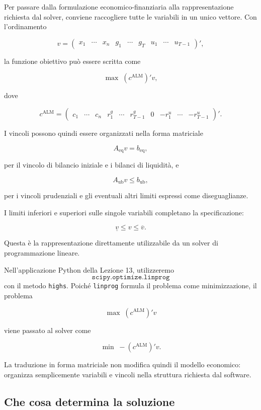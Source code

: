 Per passare dalla formulazione economico-finanziaria alla rappresentazione
richiesta dal solver, conviene raccogliere tutte le variabili in un unico
vettore. Con l'ordinamento

\[
v
=
\begin{pmatrix}
x_1 & \cdots & x_n &
g_1 & \cdots & g_T &
u_1 & \cdots & u_{T-1}
\end{pmatrix}',
\]

\noindent la funzione obiettivo pu\`o essere scritta come

\[
\max\; (c^{\mathrm{ALM}})'v,
\]

\noindent dove

\[
c^{\mathrm{ALM}}
=
\begin{pmatrix}
c_1 & \cdots & c_n &
r_1^{g} & \cdots & r_{T-1}^{g} & 0 &
-r_1^{u} & \cdots & -r_{T-1}^{u}
\end{pmatrix}'.
\]

I vincoli possono quindi essere organizzati nella forma matriciale

\[
A_{\mathrm{eq}}v=b_{\mathrm{eq}},
\]

\noindent per il vincolo di bilancio iniziale e i bilanci di liquidit\`a, e

\[
A_{\mathrm{ub}}v\leq b_{\mathrm{ub}},
\]

\noindent per i vincoli prudenziali e gli eventuali altri limiti espressi come
diseguaglianze.

I limiti inferiori e superiori sulle singole variabili completano la
specificazione:

\[
\underline v\leq v\leq\overline v.
\]

Questa \`e la rappresentazione direttamente utilizzabile da un solver di
programmazione lineare.

Nell'applicazione Python della Lezione 13, utilizzeremo
\[
\texttt{scipy.optimize.linprog}
\]
con il metodo \texttt{highs}. Poich\'e
\texttt{linprog} formula il problema come minimizzazione, il problema

\[
\max\;(c^{\mathrm{ALM}})'v
\]

\noindent viene passato al solver come

\[
\min\;-(c^{\mathrm{ALM}})'v.
\]

La traduzione in forma matriciale non modifica quindi il modello economico:
organizza semplicemente variabili e vincoli nella struttura richiesta dal
software.

\subsection{Che cosa determina la soluzione}


